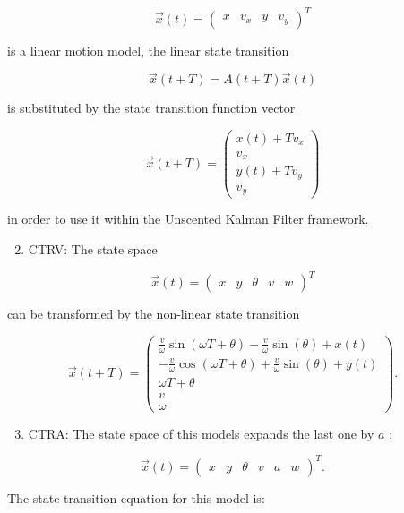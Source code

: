 $$
\vec{x}(t)=\left(\begin{array}{cccc}
	x & v_{x} & y & v_{y}
\end{array}\right)^{T}
$$

is a linear motion model, the linear state transition

$$
\vec{x}(t+T)=A(t+T) \vec{x}(t)
$$

is substituted by the state transition function vector

$$
\vec{x}(t+T)=\left(\begin{array}{c}
	x(t)+T v_{x} \\
	v_{x} \\
	y(t)+T v_{y} \\
	v_{y}
\end{array}\right)
$$

in order to use it within the Unscented Kalman Filter framework.

\begin{enumerate}
	\setcounter{enumi}{1}
	\item CTRV: The state space
\end{enumerate}

$$
\vec{x}(t)=\left(\begin{array}{ccccc}
	x & y & \theta & v & w
\end{array}\right)^{T}
$$

can be transformed by the non-linear state transition

$$
\vec{x}(t+T)=\left(\begin{array}{c}
	\frac{v}{\omega} \sin (\omega T+\theta)-\frac{v}{\omega} \sin (\theta)+x(t) \\
	-\frac{v}{\omega} \cos (\omega T+\theta)+\frac{v}{\omega} \sin (\theta)+y(t) \\
	\omega T+\theta \\
	v \\
	\omega
\end{array}\right) .
$$

\begin{enumerate}
	\setcounter{enumi}{2}
	\item CTRA: The state space of this models expands the last one by $a$ :
\end{enumerate}

$$
\vec{x}(t)=\left(\begin{array}{llllll}
	x & y & \theta & v & a & w
\end{array}\right)^{T} .
$$

The state transition equation for this model is:

